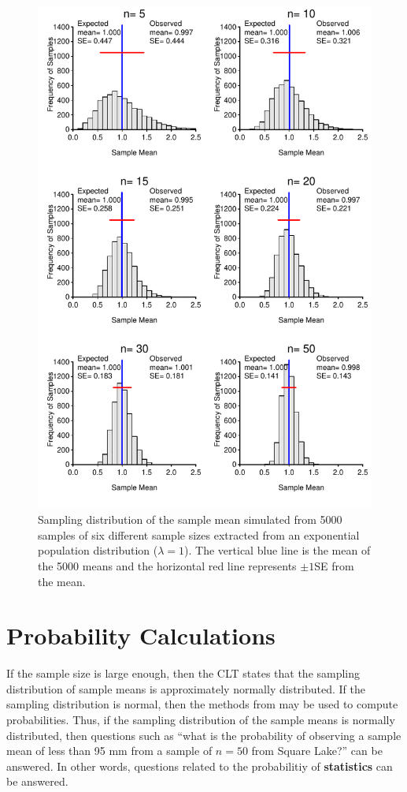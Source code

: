 \documentclass[10pt,openany]{book}\usepackage[]{graphicx}\usepackage[]{color}
\newenvironment{knitrout}{}{} %
\begin{document}
\begin{knitrout}
\color{fgcolor}\begin{figure}[hbtp]

{\centering \includegraphics[width=.8\linewidth]{Figs/SampDistExpMeann-1} 

}

\caption[Sampling distribution of sample means from exponential distribution]{Sampling distribution of the sample mean simulated from 5000 samples of six different sample sizes extracted from an exponential population distribution ($\lambda=1$).  The vertical blue line is the mean of the 5000 means and the horizontal red line represents $\pm1$SE from the mean.}\label{fig:SampDistExpMeann}
\end{figure}


\end{knitrout}


\section{Probability Calculations} \label{sect:sdprob} 
\vspace{-12pt}
If the sample size is large enough, then the CLT states that the sampling distribution of sample means is approximately normally distributed.  If the sampling distribution is normal, then the methods from  may be used to compute probabilities.  Thus, if the sampling distribution of the sample means is normally distributed, then questions such as ``what is the probability of observing a sample mean of less than 95 mm from a sample of $n=50$ from Square Lake?'' can be answered.  In other words, questions related to the probabilitiy of \textbf{statistics} can be answered.
\end{document}
